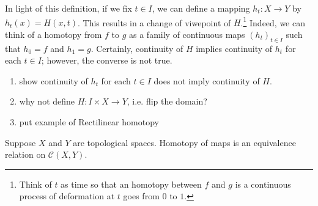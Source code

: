 
In light of this definition, if we fix \(t\in I\),  we can define a mapping \(h_t \colon X\to Y\) by \(h_t(x) = H(x,t)\). This results in a change of viwepoint of \(H\).\footnote{Think of \(t\) as time so that an homotopy between \(f\) and \(g\) is a continuous process of deformation at  \(t\) goes from \(0\) to \(1\).} Indeed, we can think of a homotopy from \(f\) to \(g\) as a family of continuous maps \(\left( h_t \right)_{t\in I}\) such that \(h_0 = f\) and \(h_1 = g\). Certainly,  continuity of \(H\) implies continuity of \(h_t\) for each \(t\in I\); however, the converse is not true.




    

\begin{example}
\begin{enumerate}[label=(\alph*)]
    \item show continuity of \(h_t\) for each \(t\in I\) does not imply continuity of \(H\). 
    \item why not define \(H:I\times X\to Y\), i.e. flip the domain?
    \item put example of Rectilinear homotopy
\end{enumerate}
\end{example}


\begin{theoremaa}\label{homotopy.is.eq.relation}
    Suppose \(X\)  and \(Y\) are topological spaces. 
    Homotopy of maps is an equivalence relation on \(\mathcal{C}(X,Y)\).
\end{theoremaa}

